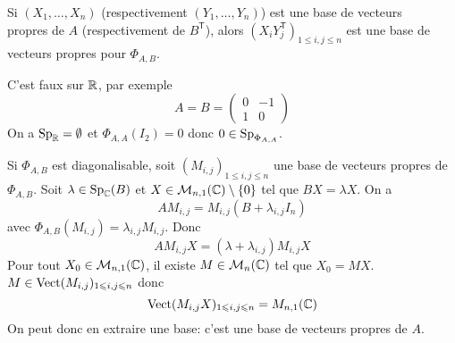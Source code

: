 \documentclass[12pt]{article}
\begin{document}
\begin{remark}
	Si $(X_{1},\dots,X_{n})$ (respectivement $(Y_{1},\dots,Y_{n})$) est une base de vecteurs\\propres de $A$ (respectivement de $B^{\mathsf{T}}$), alors $(X_{i}Y_{j}^{\mathsf{T}})_{1\leqslant i,j\leqslant n}$ est une base de vecteurs propres pour $\Phi_{A,B}$.
\end{remark}

\begin{remark}
	C'est faux sur $\mathbb{R}$, par exemple 
	\begin{equation}
		A=B=
		\begin{pmatrix}
			0 & -1\\
			1 &0	
		\end{pmatrix}
	\end{equation}
	On a $\operatorname{Sp}_{\mathbb{R}}=\emptyset$ et $\Phi_{A,A}(I_{2})=0$ donc $0\in\operatorname{Sp}_{\Phi_{A,A}}$.
\end{remark}

\begin{remark}
	Si $\Phi_{A,B}$ est diagonalisable, soit $(M_{i,j})_{1\leqslant i,j\leqslant n}$ une base de vecteurs propres de $\Phi_{A,B}$. Soit $\lambda\in\operatorname{Sp}_{\mathbb{C}}(B)$ et $X\in\mathcal{M}_{n,1}(\mathbb{C})\setminus\lbrace0\rbrace$ tel que $BX=\lambda X$. On a 
	\begin{equation}
		AM_{i,j}=M_{i,j}(B+\lambda_{i,j}I_{n})
	\end{equation}
	avec $\Phi_{A,B}(M_{i,j})=\lambda_{i,j}M_{i,j}$. Donc 
	\begin{equation}
		AM_{i,j}X=(\lambda+\lambda_{i,j})M_{i,j}X
	\end{equation}
	Pour tout $X_{0}\in\mathcal{M}_{n,1}(\mathbb{C})$, il existe $M\in\mathcal{M}_{n}(\mathbb{C})$ tel que $X_{0}=MX$. $M\in\operatorname{Vect}(M_{i,j})_{1\leqslant i,j\leqslant n}$ donc 
	\begin{equation}
		\operatorname{Vect}(M_{i,j}X)_{1\leqslant i,j\leqslant n}=M_{n,1}(\mathbb{C})
	\end{equation}
	On peut donc en extraire une base: c'est une base de vecteurs propres de $A$.
\end{remark}
\end{document}
